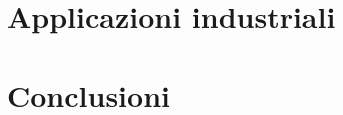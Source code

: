 \clearpage{\pagestyle{plain}\cleardoublepage} %
\chapter{Applicazioni industriali} %
\label{chapter:chapter5} %

\clearpage{\pagestyle{plain}\cleardoublepage} %
\chapter{Conclusioni} %
\label{chapter:chapter6} %

\clearpage{\pagestyle{plain}\cleardoublepage}

